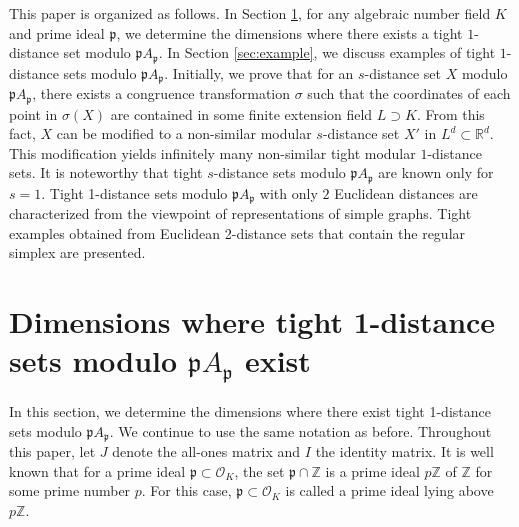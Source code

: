 \documentclass[a4paper, 11pt]{article}
\newcommand{\R}{\mathbb{R}}
\newcommand{\Z}{\mathbb{Z}}
\newcommand{\p}{\mathfrak{p}}
\newcommand{\Oc}{\mathcal{O}}
\theoremstyle{definition}
\begin{document}
This paper is organized as follows.
In Section \ref{sec:exist}, for any algebraic number field $K$ and prime ideal $\p$, 
we determine the dimensions where there exists a tight $1$-distance set modulo $\p A_\p$. 
In Section \ref{sec:example}, we discuss examples of tight $1$-distance sets modulo $\p A_\p$. 
Initially, we prove that for an $s$-distance set $X$ modulo $\p A_\p$, there exists 
a congruence transformation $\sigma$ such that the coordinates of each point in $\sigma(X)$ are contained in some finite extension field $L \supset K$. 
From this fact, $X$ can be modified to a non-similar modular $s$-distance set $X'$ in $ L^d\subset \R^d$. This modification yields infinitely many non-similar tight modular $1$-distance sets.  
 It is noteworthy that tight $s$-distance sets modulo $\p A_\p$ are known only for $s=1$. 
Tight 1-distance sets modulo $\p A_\p$ with only $2$ Euclidean distances are characterized from the viewpoint of representations of simple graphs. Tight examples obtained from Euclidean 2-distance sets that contain the regular simplex are presented. 

   
 










\section{Dimensions where tight 1-distance sets modulo $\p A_\p$ exist } \label{sec:exist}
In this section, we determine the dimensions where there exist tight 1-distance sets modulo $\p A_\p$. 
We continue to use the same notation as before. 
Throughout this paper, let $J$ denote the all-ones matrix and $I$ the identity matrix.   
It is well known that for a prime ideal $\p \subset \Oc_K$, the set $\p \cap \Z $ is a prime ideal $p \Z$ of $\Z$ for some prime number $p$. For this case,  $\p \subset \Oc_K$ is called a  prime ideal lying above $p\Z$. 
\end{document}
